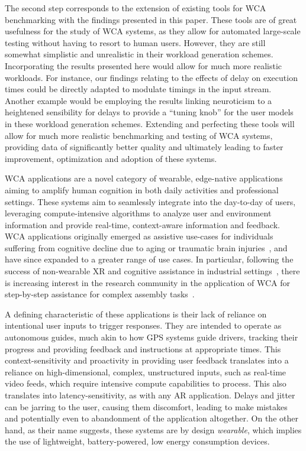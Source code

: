 The second step corresponds to the extension of existing tools for WCA benchmarking with the findings presented in this paper.
These tools are of great usefulness for the study of WCA systems, as they allow for automated large-scale testing without having to resort to human users.
However, they are still somewhat simplistic and unrealistic in their workload generation schemes.
Incorporating the results presented here would allow for much more realistic workloads.
For instance, our findings relating to the effects of delay on execution times could be directly adapted to modulate timings in the input stream.
Another example would be employing the results linking neuroticism to a heightened sensibility for delays to provide a ``tuning knob'' for the user models in these workload generation schemes.
Extending and perfecting these tools will allow for much more realistic benchmarking and testing of WCA systems, providing data of significantly better quality and ultimately leading to faster improvement, optimization and adoption of these systems.


\acf{WCA} applications are a novel category of wearable, edge-native applications aiming to amplify human cognition in both daily activities and professional settings.
These systems aim to seamlessly integrate into the day-to-day of users, leveraging compute-intensive algorithms to analyze user and environment information and provide real-time, context-aware information and feedback.
\ac{WCA} applications originally emerged as assistive use-cases for individuals suffering from cognitive decline due to aging or traumatic brain injuries~\cite{satyanarayanan2009case,Ha2014towards,Satya2019augmenting}, and have since expanded to a greater range of use cases.
In particular, following the success of non-wearable \ac{XR} and cognitive assistance in industrial settings~\cite{Funk2015Cognitive,Wang2022Comprehensive}, there is increasing interest in the research community in the application of \ac{WCA} for step-by-step assistance for complex assembly tasks~\cite{Chen2017Empirical,belletier2021wearable}.

A defining characteristic of these applications is their lack of reliance on intentional user inputs to trigger responses.
They are intended to operate as autonomous guides, much akin to how \ac{GPS} systems guide drivers, tracking their progress and providing feedback and instructions at appropriate times.
This context-sensitivity and proactivity in providing user feedback translates into a reliance on high-dimensional, complex, unstructured inputs, such as real-time video feeds, which require intensive compute capabilities to process.
This also translates into latency-sensitivity, as with any \ac{AR} application.
Delays and jitter can be jarring to the user, causing them discomfort, leading to make mistakes and potentially even to abandonment of the application altogether.
On the other hand, as their name suggests, these systems are by design \emph{wearable}, which implies the use of lightweight, battery-powered, low energy consumption devices.


